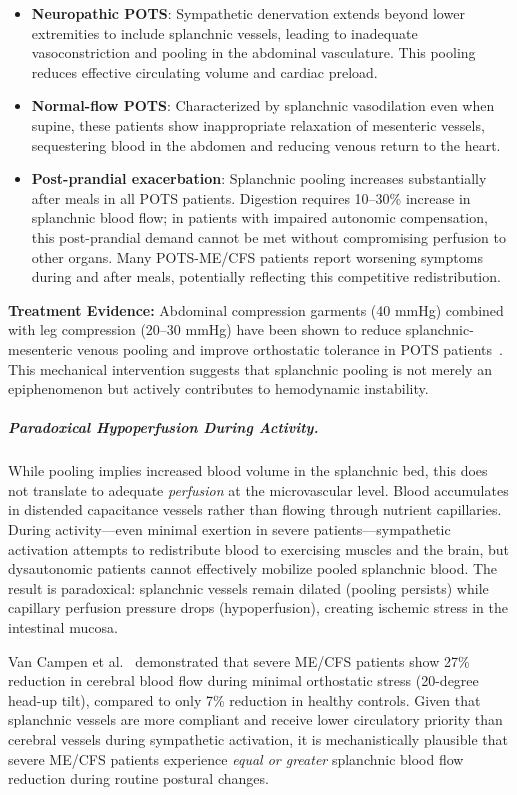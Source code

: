 \begin{itemize}
    \item \textbf{Neuropathic POTS}: Sympathetic denervation extends beyond lower extremities to include splanchnic vessels, leading to inadequate vasoconstriction and pooling in the abdominal vasculature. This pooling reduces effective circulating volume and cardiac preload.

    \item \textbf{Normal-flow POTS}: Characterized by splanchnic vasodilation even when supine, these patients show inappropriate relaxation of mesenteric vessels, sequestering blood in the abdomen and reducing venous return to the heart.

    \item \textbf{Post-prandial exacerbation}: Splanchnic pooling increases substantially after meals in all POTS patients. Digestion requires 10--30\% increase in splanchnic blood flow; in patients with impaired autonomic compensation, this post-prandial demand cannot be met without compromising perfusion to other organs. Many POTS-ME/CFS patients report worsening symptoms during and after meals, potentially reflecting this competitive redistribution.
\end{itemize}

\textbf{Treatment Evidence:} Abdominal compression garments (40 mmHg) combined with leg compression (20--30 mmHg) have been shown to reduce splanchnic-mesenteric venous pooling and improve orthostatic tolerance in POTS patients~\cite{terSteege2012}. This mechanical intervention suggests that splanchnic pooling is not merely an epiphenomenon but actively contributes to hemodynamic instability.

\subparagraph{Paradoxical Hypoperfusion During Activity.}
While pooling implies increased blood volume in the splanchnic bed, this does not translate to adequate \textit{perfusion} at the microvascular level. Blood accumulates in distended capacitance vessels rather than flowing through nutrient capillaries. During activity---even minimal exertion in severe patients---sympathetic activation attempts to redistribute blood to exercising muscles and the brain, but dysautonomic patients cannot effectively mobilize pooled splanchnic blood. The result is paradoxical: splanchnic vessels remain dilated (pooling persists) while capillary perfusion pressure drops (hypoperfusion), creating ischemic stress in the intestinal mucosa.

Van Campen et al.~\cite{VanCampen2020SeverityCPET} demonstrated that severe ME/CFS patients show 27\% reduction in cerebral blood flow during minimal orthostatic stress (20-degree head-up tilt), compared to only 7\% reduction in healthy controls. Given that splanchnic vessels are more compliant and receive lower circulatory priority than cerebral vessels during sympathetic activation, it is mechanistically plausible that severe ME/CFS patients experience \textit{equal or greater} splanchnic blood flow reduction during routine postural changes.

